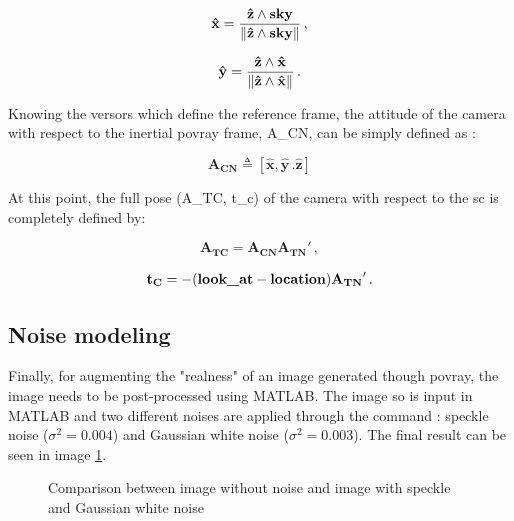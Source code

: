 \begin{equation}
  \mathbf{\hat{x}} = \frac{\mathbf{\hat{z}} \wedge \text{\inlinecode{POV}{sky}}}{\norm{\mathbf{\hat{z}} \wedge \text{\inlinecode{POV}{sky}}}} \,,
\end{equation}

\begin{equation}
  \mathbf{\hat{y}} = \frac{\mathbf{\hat{z}} \wedge \mathbf{\hat{x}}}{\left\lVert\mathbf{\hat{z}} \wedge \mathbf{\hat{x}}\right\rVert} \,.
\end{equation}

Knowing the versors which define the reference frame, the attitude of the camera with respect to the inertial \acrshort{povray} frame, \gls{A_CN}, can be simply defined as :

\begin{equation}
  \mathbf{{A_{CN}}} \triangleq [\mathbf{\hat{x}}, \mathbf{\hat{y}} \,. \mathbf{\hat{z}}]
\end{equation}

At this point, the full pose (\gls{A_TC}, \gls{t_c}) of the camera with respect to the \acrshort{sc} is completely defined by:

\begin{equation}
  \mathbf{{A_{TC}}} = \mathbf{{A_{CN}}} \mathbf{{A_{TN}}'} \,,
\end{equation}

\begin{equation}
  \mathbf{t_C} = - (\text{\inlinecode{POV}{look_at}} - \text{\inlinecode{POV}{location}}) \mathbf{{A_{TN}}'} \,.
\end{equation}

\subsection{Noise modeling}\label{subsection:addingthenoise}
Finally, for augmenting the "realness" of an image generated though \acrshort{povray}, the image needs to be post-processed using MATLAB.
The image so is input in MATLAB and two different noises are applied through the  command : speckle noise ($\sigma^2 = 0.004$) and Gaussian white noise ($\sigma^2 = 0.003$).
The final result can be seen in image \ref{fig:comparisonNoise}.

\begin{figure}[htbp]
  \centering
  \qquad
  \caption{Comparison between image without noise and image with speckle and Gaussian white noise}
  \label{fig:comparisonNoise}
\end{figure}

